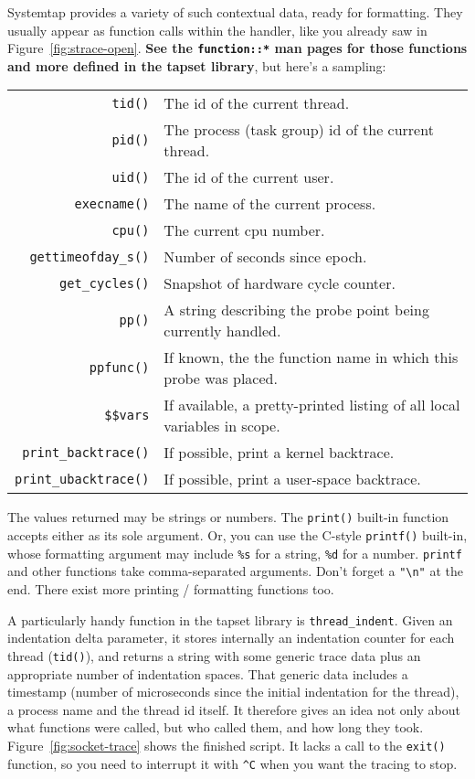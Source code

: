 \documentclass{article}
\begin{document}
Systemtap provides a variety of such contextual data, ready for
formatting.  They usually appear as function calls within the handler,
like you already saw in Figure~\ref{fig:strace-open}.  {\bf See the
\verb+function::*+ man pages for those functions and more defined in the
tapset library}, but here's a sampling:

\begin{tabular}{rl}
\verb+tid()+ & The id of the current thread. \\
\verb+pid()+ & The process (task group) id of the current thread. \\
\verb+uid()+ & The id of the current user. \\
\verb+execname()+ & The name of the current process. \\
\verb+cpu()+ & The current cpu number. \\
\verb+gettimeofday_s()+ & Number of seconds since epoch. \\
\verb+get_cycles()+ & Snapshot of hardware cycle counter. \\
\verb+pp()+ & A string describing the probe point being currently handled. \\
\verb+ppfunc()+ & If known, the the function name in which this probe was
                  placed. \\
\verb+$$vars+ & If available, a pretty-printed listing of all local
                variables in scope. \\
\verb+print_backtrace()+ & If possible, print a kernel backtrace. \\
\verb+print_ubacktrace()+ & If possible, print a user-space backtrace. \\
\end{tabular}

The values returned may be strings or numbers.  The \verb+print()+
built-in function accepts either as its sole argument.  Or, you can
use the C-style \verb+printf()+ built-in, whose formatting argument
may include \verb+%s+ for a string, \verb+%d+ for a number.
\verb+printf+ and other functions take comma-separated arguments.
Don't forget a \verb+"\n"+ at the end.  There exist more printing /
formatting functions too.

A particularly handy function in the tapset library is
\verb+thread_indent+.  Given an indentation delta parameter, it stores
internally an indentation counter for each thread (\verb+tid()+), and
returns a string with some generic trace data plus an appropriate
number of indentation spaces.  That generic data includes a timestamp
(number of microseconds since the initial indentation for the thread), a
process name and the thread id itself.  It therefore gives an idea not
only about what functions were called, but who called them, and how
long they took.  Figure~\ref{fig:socket-trace} shows the finished
script.  It lacks a call to the \verb+exit()+ function, so you need to
interrupt it with \verb+^C+ when you want the tracing to stop.
\end{document}

